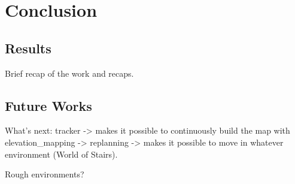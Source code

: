 \chapter{Conclusion}
\section{Results}
Brief recap of the work and recaps.

\section{Future Works}
What's next: tracker -> makes it possible to continuously build the map with 
elevation\_mapping -> replanning -> makes it possible to move in whatever 
environment (World of Stairs).

Rough environments?

